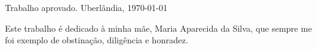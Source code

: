 \documentclass[
  12pt,				%
  openright,			%
  twoside,			%
  a4paper,			%
  english,			%
  french,				%
  spanish,			%
  brazil,				%
  ]{abntex2}
\begin{document}
\begin{folhadeaprovacao}

  \begin{center}

    {\ABNTEXchapterfont\large\textsc{\imprimirautor}}

    {\ABNTEXchapterfont\Large\bfseries\imprimirtitulo}

  \end{center}

  \vspace{1cm}

  \hspace{.45\textwidth} \begin{minipage}{.45\textwidth}

    \imprimirpreambulo

  \end{minipage}

  \vspace{1cm}

  Trabalho aprovado. Uberlândia, \today




  \begin{center}
    \vfill
    {\large\imprimirlocal}
    \par
    {\large\imprimirdata}

  \end{center}
\end{folhadeaprovacao}


\begin{dedicatoria}
  \vspace*{\fill}
  Este trabalho é dedicado à minha mãe, Maria Aparecida da Silva, que sempre me foi exemplo de obstinação, diligência e honradez.
  \vspace*{\fill}

\end{dedicatoria}
\end{document}
